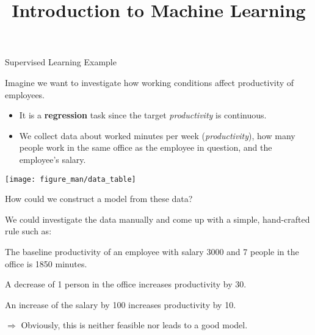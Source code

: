 \documentclass[11pt,compress,t,notes=noshow, xcolor=table]{beamer}
\title{Introduction to Machine Learning}
\begin{document}



\begin{vbframe}{Supervised Learning Example}
  
  Imagine we want to investigate how working conditions affect productivity of employees.
  
  \begin{itemize}
    \item It is a \textbf{regression} task since the target \emph{productivity} is continuous.
    \item We collect data about worked minutes 
    per week (\emph{productivity}), how many people work in the same office as the 
    employee in question, and the employee's salary.
  \end{itemize}
  
  \begin{center}
    \texttt{[image: figure\_man/data\_table]} 
  \end{center}
  
  \framebreak
  
  How could we construct a model from these data?
  \vfill
  
  We could investigate the data manually and come up with a simple, hand-crafted rule such as:
  
  \vfill
  
  \begin{itemizeL}
    \item The baseline productivity of an employee with salary 3000 and 7 people in the office is 1850 minutes.
    \item A decrease of 1 person in the office increases productivity by 30.
    \item An increase of the salary by 100 increases productivity by 10.
  \end{itemizeL}
  
  \vfill
  
$\Rightarrow$ Obviously, this is neither feasible nor leads to a good model.
\end{vbframe}
\end{document}
